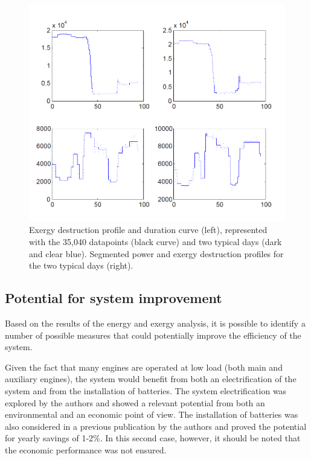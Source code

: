 \documentclass[preprint,12pt]{elsarticle}
\begin{document}
\begin{figure}[htbp!]
	\centering
	\includegraphics[width=0.95\linewidth]{Figures/segmentation_power_exergy.png}
	\caption{Exergy destruction profile and duration curve (left), represented with the 35,040 datapoints (black curve) and two typical days (dark and clear blue). Segmented power and exergy destruction profiles for the two typical days (right). }
	\label{fig:res:exergyDestructionProfile}
\end{figure}




\subsection{Potential for system improvement}

Based on the results of the energy and exergy analysis, it is possible to identify a number of possible measures that could potentially improve the efficiency of the system. 

Given the fact that many engines are operated at low load (both main and auxiliary engines), the system would benefit from both an electrification of the system and from the installation of batteries. The system electrification was explored by the authors \cite{Baldi2016b} and showed a relevant potential from both an environmental and an economic point of view. The installation of batteries was also considered in a previous publication by the authors \cite{Baldi2017} and proved the potential for yearly savings of 1-2\%. In this second case, however, it should be noted that the economic performance was not ensured. 
\end{document}
